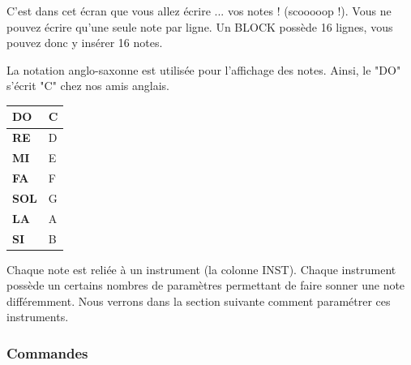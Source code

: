 \documentclass[12pt,a4paper]{article}
\begin{document}
    C'est dans cet écran que vous allez écrire ... vos notes ! (scooooop !). Vous ne pouvez écrire qu'une seule note par ligne. Un BLOCK possède 16 lignes, vous pouvez donc y insérer 16 notes.\medskip
    
    La notation anglo-saxonne est utilisée pour l'affichage des notes. Ainsi, le "DO" s'écrit "C" chez nos amis anglais.\medskip
    
        \begin{center}
            \tablelasttail{\hline}
            \begin{supertabular}{|l|l|}
            \hline
                {\bf DO} & C \\
                \hline
                {\bf RE} & D \\
                \hline
                {\bf MI} & E \\
                \hline
                {\bf FA} & F \\
                \hline
                {\bf SOL} & G \\
                \hline
                {\bf LA} & A \\
                \hline
                {\bf SI} & B \\
            \hline    
            \end{supertabular}
        \end{center}
    
    
    Chaque note est reliée à un instrument (la colonne INST). Chaque instrument possède un certains nombres de paramètres permettant de faire sonner une note différemment. Nous verrons dans la section suivante comment paramétrer ces instruments. 
    
    
        \subsubsection{Commandes}
        
\end{document}
